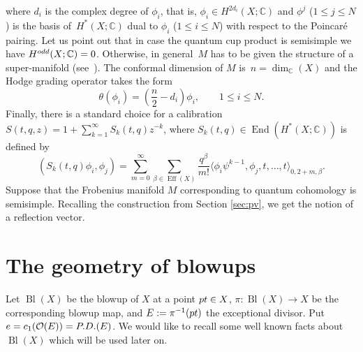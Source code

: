 \documentclass[10pt,a4paper]{article}
\numberwithin{equation}{section}
\newcommand{\CC}{\mathbb{C}}
\renewcommand{\O}{\mathcal{O}}
\begin{document}
where $d_i$ is the complex degree of $\phi_i$, that is, $\phi_i\in
H^{2d_i}(X;\CC)$ and $\phi^j$ ($1\leq j\leq N$) is the basis of~$H^*(X;\CC)$ dual to $\phi_i$ ($1\leq i\leq N$) with respect to the
Poincar\'e pairing. Let us point out that in case the quantum cup
product is semisimple we have $H^{\rm odd}(X;\CC)=0$. Otherwise, in
general~$M$ has to be given the structure of a super-manifold (see~\cite{Ma}). The conformal dimension of $M$ is~$n=\operatorname{dim}_\CC(X)$ and the Hodge grading operator takes the
form
\begin{equation}\label{qcoh_hgo}
\theta(\phi_i) =\left(\frac{n}{2} - d_i\right) \phi_i,\qquad 1\leq i\leq N.
\end{equation}
Finally, there is a standard choice for a calibration
$S(t,q,z)=1+\sum_{k=1}^\infty S_k(t,q) z^{-k}$, where
$S_k(t,q)\in \operatorname{End}(H^*(X;\CC))$ is defined by
\begin{equation}\label{calibration}
(S_k(t,q)\phi_i,\phi_j) =
\sum_{m=0}^\infty
\sum_{\beta\in \operatorname{Eff}(X)} \frac{q^\beta}{m!}
\big\langle \phi_i \psi^{k-1}, \phi_j, t,\dots,t\big\rangle_{0,2+m,\beta}.
\end{equation}
Suppose that the Frobenius manifold $M$ corresponding to quantum cohomology is
semisimple. Recalling the construction from Section \ref{sec:pv}, we get the notion
of a reflection vector.

\section{The geometry of blowups}\label{sec:blowups}

Let $\operatorname{Bl}(X)$ be the blowup of $X$ at a point ${\rm pt}\in X$,
$\pi\colon \operatorname{Bl}(X)\to X$ be the corresponding
blowup map, and $E:=\pi^{-1}({\rm pt})$ the
exceptional divisor. Put $e=c_1(\O(E))={\rm P.D.}(E)$.
We would like to recall some well known facts about
$\operatorname{Bl}(X)$ which will be used later on.
\end{document}
